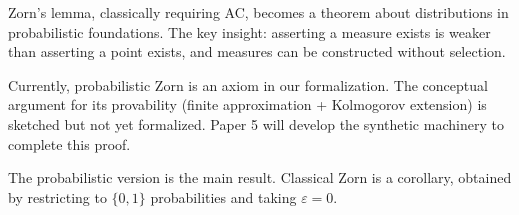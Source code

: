 \documentclass[11pt,a4paper]{article}
\begin{document}
Zorn's lemma, classically requiring AC, becomes a theorem about distributions in probabilistic foundations. The key insight: asserting a measure exists is weaker than asserting a point exists, and measures can be constructed without selection.

Currently, probabilistic Zorn is an axiom in our formalization. The conceptual argument for its provability (finite approximation + Kolmogorov extension) is sketched but not yet formalized. Paper 5 will develop the synthetic machinery to complete this proof.

The probabilistic version is the main result. Classical Zorn is a corollary, obtained by restricting to $\{0,1\}$ probabilities and taking $\varepsilon = 0$.


\end{document}
